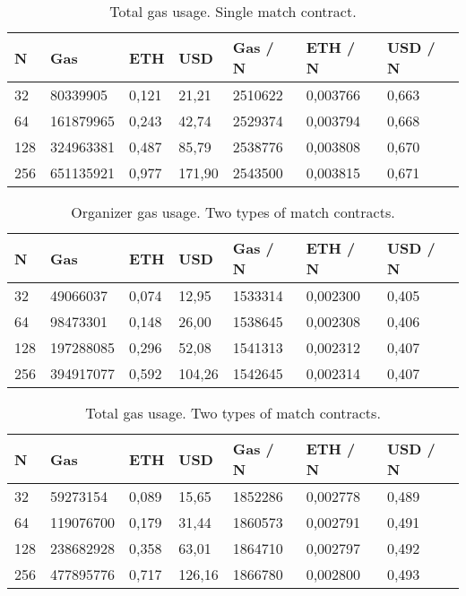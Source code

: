 \begin{table}[h]
\centering
\caption{Total gas usage. Single match contract.}
\label{tab:total-gas-usage-single}
\begin{tabular}{|l|l|l|l|l|l|l|}
\hline

N & Gas & ETH & USD & Gas / N & ETH / N & USD / N \\ \hline
32 & 80339905 & 0,121 & 21,21 & 2510622 & 0,003766 & 0,663 \\ \hline
64 & 161879965 & 0,243 & 42,74 & 2529374 & 0,003794 & 0,668 \\ \hline
128 & 324963381 & 0,487 & 85,79 & 2538776 & 0,003808 & 0,670 \\ \hline
256 & 651135921 & 0,977 & 171,90 & 2543500 & 0,003815 & 0,671 \\ \hline

\end{tabular}
\end{table}

\begin{table}[h]
\centering
\caption{Organizer gas usage. Two types of match contracts.}
\label{tab:org-gas-usage-dual}
\begin{tabular}{|l|l|l|l|l|l|l|}
\hline

N & Gas & ETH & USD & Gas / N & ETH / N & USD / N \\ \hline
32 & 49066037 & 0,074 & 12,95 & 1533314 & 0,002300 & 0,405 \\ \hline
64 & 98473301 & 0,148 & 26,00 & 1538645 & 0,002308 & 0,406 \\ \hline
128 & 197288085 & 0,296 & 52,08 & 1541313 & 0,002312 & 0,407 \\ \hline
256 & 394917077 & 0,592 & 104,26 & 1542645 & 0,002314 & 0,407 \\ \hline

\end{tabular}
\end{table}

\begin{table}[h]
\centering
\caption{Total gas usage. Two types of match contracts.}
\label{tab:total-gas-usage-dual}
\begin{tabular}{|l|l|l|l|l|l|l|}
\hline

N & Gas & ETH & USD & Gas / N & ETH / N & USD / N \\ \hline
32 & 59273154 & 0,089 & 15,65 & 1852286 & 0,002778 & 0,489 \\ \hline
64 & 119076700 & 0,179 & 31,44 & 1860573 & 0,002791 & 0,491 \\ \hline
128 & 238682928 & 0,358 & 63,01 & 1864710 & 0,002797 & 0,492 \\ \hline
256 & 477895776 & 0,717 & 126,16 & 1866780 & 0,002800 & 0,493 \\ \hline

\end{tabular}
\end{table}

